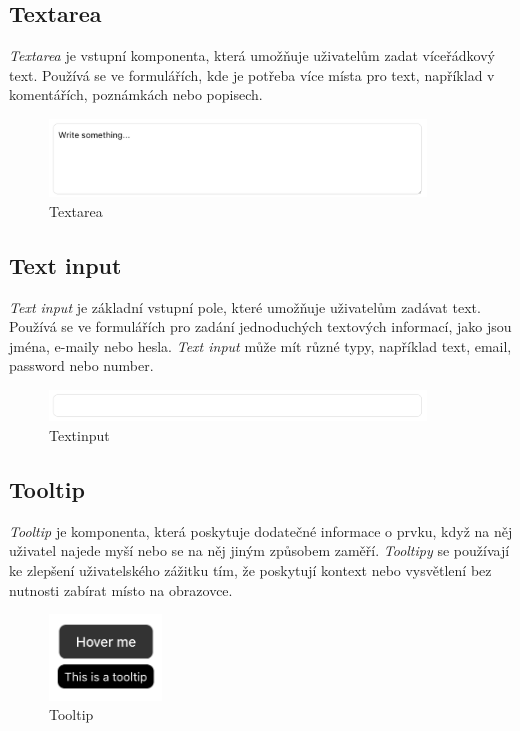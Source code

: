 \subsection{Textarea}
\emph{Textarea} je vstupní komponenta, která umožňuje uživatelům zadat víceřádkový text. Používá se ve formulářích, kde je potřeba více místa pro text, například v komentářích, poznámkách nebo popisech.

\begin{figure}[H]
  \centering
  \includegraphics[width=10cm]{images/textarea}
  \captionsetup{justification=centering,margin=2cm}
  \caption{Textarea} \label{picture:textarea}
\end{figure}

\subsection{Text input}
\emph{Text input} je základní vstupní pole, které umožňuje uživatelům zadávat text. Používá se ve formulářích pro zadání jednoduchých textových informací, jako jsou jména, e-maily nebo hesla. \emph{Text input} může mít různé typy, například text, email, password nebo number.

\begin{figure}[H]
  \centering
  \includegraphics[width=10cm]{images/textinput}
  \captionsetup{justification=centering,margin=2cm}
  \caption{Textinput} \label{picture:textinput}
\end{figure}

\subsection{Tooltip}
\emph{Tooltip} je komponenta, která poskytuje dodatečné informace o prvku, když na něj uživatel najede myší nebo se na něj jiným způsobem zaměří. \emph{Tooltipy} se používají ke zlepšení uživatelského zážitku tím, že poskytují kontext nebo vysvětlení bez nutnosti zabírat místo na obrazovce.

\begin{figure}[H]
  \centering
  \includegraphics[width=3cm]{images/tooltip}
  \captionsetup{justification=centering,margin=2cm}
  \caption{Tooltip} \label{picture:tooltip}
\end{figure}

